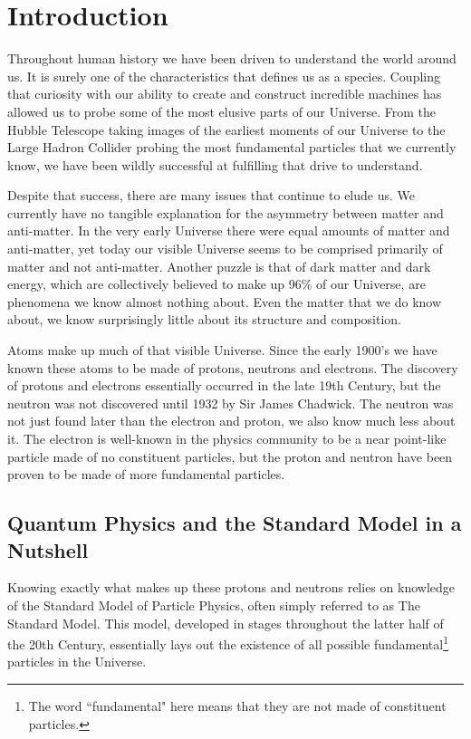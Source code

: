 \chapter{Introduction}
\label{ch:introduction}
Throughout human history we have been driven to understand the world around us. It is surely one of the characteristics that defines us as a species. Coupling that curiosity with our ability to create and construct incredible machines has allowed us to probe some of the most elusive parts of our Universe. From the Hubble Telescope taking images of the earliest moments of our Universe to the Large Hadron Collider probing the most fundamental particles that we currently know, we have been wildly successful at fulfilling that drive to understand.

Despite that success, there are many issues that continue to elude us. We currently have no tangible explanation for the asymmetry between matter and anti-matter. In the very early Universe there were equal amounts of matter and anti-matter, yet today our visible Universe seems to be comprised primarily of matter and not anti-matter. Another puzzle is that of dark matter and dark energy, which are collectively believed to make up 96\% of our Universe, are phenomena we know almost nothing about. Even the matter that we do know about, we know surprisingly little about its structure and composition.

Atoms make up much of that visible Universe. Since the early 1900's we have known these atoms to be made of protons, neutrons and electrons. The discovery of protons and electrons essentially occurred in the late 19th Century, but the neutron was not discovered until 1932 by Sir James Chadwick. The neutron was not just found later than the electron and proton, we also know much less about it. The electron is well-known in the physics community to be a near point-like particle made of no constituent particles, but the proton and neutron have been proven to be made of more fundamental particles.

\section{Quantum Physics and the Standard Model in a Nutshell}
Knowing exactly what makes up these protons and neutrons relies on knowledge of the Standard Model of Particle Physics, often simply referred to as The Standard Model. This model, developed in stages throughout the latter half of the 20th Century, essentially lays out the existence of all possible fundamental\footnote{The word ``fundamental" here means that they are not made of constituent particles.} particles in the Universe.

